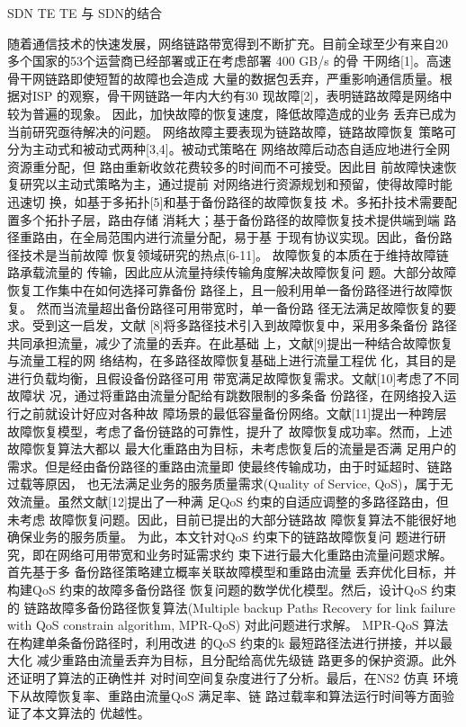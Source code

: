 SDN
TE
TE 与 SDN的结合




随着通信技术的快速发展，网络链路带宽得到不断扩充。目前全球至少有来自20 多个国家的53个运营商已经部署或正在考虑部署 400 GB/s 的骨
干网络[1]。高速骨干网链路即使短暂的故障也会造成
大量的数据包丢弃，严重影响通信质量。根据对ISP
的观察，骨干网链路一年内大约有30%
现故障[2]，表明链路故障是网络中较为普遍的现象。
因此，加快故障的恢复速度，降低故障造成的业务
丢弃已成为当前研究亟待解决的问题。
网络故障主要表现为链路故障，链路故障恢复
策略可分为主动式和被动式两种[3,4]。被动式策略在
网络故障后动态自适应地进行全网资源重分配，但
路由重新收敛花费较多的时间而不可接受。因此目
前故障快速恢复研究以主动式策略为主，通过提前
对网络进行资源规划和预留，使得故障时能迅速切
换，如基于多拓扑[5]和基于备份路径的故障恢复技
术。多拓扑技术需要配置多个拓扑子层，路由存储
消耗大；基于备份路径的故障恢复技术提供端到端
路径重路由，在全局范围内进行流量分配，易于基
于现有协议实现。因此，备份路径技术是当前故障
恢复领域研究的热点[6-11]。
故障恢复的本质在于维持故障链路承载流量的
传输，因此应从流量持续传输角度解决故障恢复问
题。大部分故障恢复工作集中在如何选择可靠备份
路径上，且一般利用单一备份路径进行故障恢复。
然而当流量超出备份路径可用带宽时，单一备份路
径无法满足故障恢复的要求。受到这一启发，文献
[8]将多路径技术引入到故障恢复中，采用多条备份
路径共同承担流量，减少了流量的丢弃。在此基础
上，文献[9]提出一种结合故障恢复与流量工程的网
络结构，在多路径故障恢复基础上进行流量工程优
化，其目的是进行负载均衡，且假设备份路径可用
带宽满足故障恢复需求。文献[10]考虑了不同故障状
况，通过将重路由流量分配给有跳数限制的多条备
份路径，在网络投入运行之前就设计好应对各种故
障场景的最低容量备份网络。文献[11]提出一种跨层
故障恢复模型，考虑了备份链路的可靠性，提升了
故障恢复成功率。然而，上述故障恢复算法大都以
最大化重路由为目标，未考虑恢复后的流量是否满
足用户的需求。但是经由备份路径的重路由流量即
使最终传输成功，由于时延超时、链路过载等原因，
也无法满足业务的服务质量需求(Quality of Service,
QoS)，属于无效流量。虽然文献[12]提出了一种满
足QoS 约束的自适应调整的多路径路由，但未考虑
故障恢复问题。因此，目前已提出的大部分链路故
障恢复算法不能很好地确保业务的服务质量。
为此，本文针对QoS 约束下的链路故障恢复问
题进行研究，即在网络可用带宽和业务时延需求约
束下进行最大化重路由流量问题求解。首先基于多
备份路径策略建立概率关联故障模型和重路由流量
丢弃优化目标，并构建QoS 约束的故障多备份路径
恢复问题的数学优化模型。然后，设计QoS 约束的
链路故障多备份路径恢复算法(Multiple backup
Paths Recovery for link failure with QoS constrain
algorithm, MPR-QoS) 对此问题进行求解。
MPR-QoS 算法在构建单条备份路径时，利用改进
的QoS 约束的k 最短路径法进行拼接，并以最大化
减少重路由流量丢弃为目标，且分配给高优先级链
路更多的保护资源。此外还证明了算法的正确性并
对时间空间复杂度进行了分析。最后，在NS2 仿真
环境下从故障恢复率、重路由流量QoS 满足率、链
路过载率和算法运行时间等方面验证了本文算法的
优越性。

